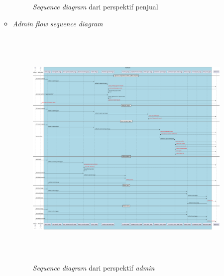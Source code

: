 \documentclass[a4paper]{article}
\begin{document}
\begin{enumerate}
\begin{itemize}
\begin{figure}[h]
                \centering
                \caption{\textit{Sequence diagram} dari perspektif penjual}
            \end{figure}
        \newpage
        \item \textit{Admin flow sequence diagram}
            \begin{figure}[h]
                \includegraphics[height=12cm,keepaspectratio]{sequence diagram admin perspective.png}
                \centering
                \caption{\textit{Sequence diagram} dari perspektif \textit{admin}}
            \end{figure}
    \end{itemize}
\end{enumerate}

\newpage
{}
\printbibliography[title=Referensi]
\end{document}
